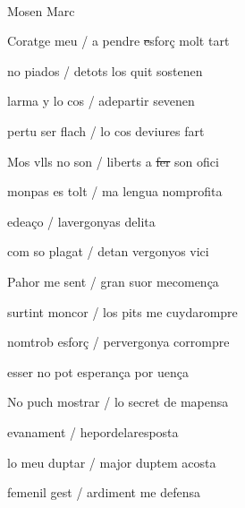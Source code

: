 \documentclass[12pt]{article}
\renewcommand{\espaiAbansEtiquetaPoema}{\vspace{0ex}}
\begin{document}
\begin{estrofa}

\espaiAbansEtiquetaPoema

\\

\begin{rubrica}

\pagina{[39r]} Mosen Marc

\end{rubrica}

\end{estrofa}


\begin{estrofa}

 Coratge meu / a pendre \sout{e}sfor\c{c} molt tart

 no piados / detots los quit sostenen

 larma y lo cos / adepartir sevenen

 pertu ser flach / lo cos deviures fart

 Mos vlls no son / liberts a \sout{fer} son ofici

 monpas es tolt / ma lengua nomprofita

 edea\c{c}o / lavergonyas delita

 com so plagat / detan vergonyos vici

\end{estrofa}



\begin{estrofa}

 Pahor me sent / gran suor mecomen\c{c}a

 surtint moncor / los pits me cuydarompre

 nomtrob esfor\c{c} / pervergonya corrompre

 esser no pot  esperan\c{c}a por uen\c{c}a

 No puch mostrar / lo secret de mapensa

 evanament / hepordelaresposta

 lo meu duptar / major duptem acosta

 femenil gest / ardiment me defensa

\end{estrofa}
\end{document}
